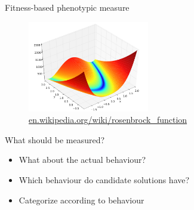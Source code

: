 \begin{frame}{Fitness-based phenotypic measure}
  \begin{figure}
    \centering
    \includegraphics[height=150px]{elias/images/elevation.png}
    \caption{\url{en.wikipedia.org/wiki/rosenbrock_function}}
  \end{figure}
\end{frame}

\begin{frame}{What should be measured?}
  \begin{itemize}
    \item What about the actual behaviour?
    \item Which behaviour do candidate solutions have?
    \item Categorize according to behaviour
  \end{itemize}
\end{frame}


